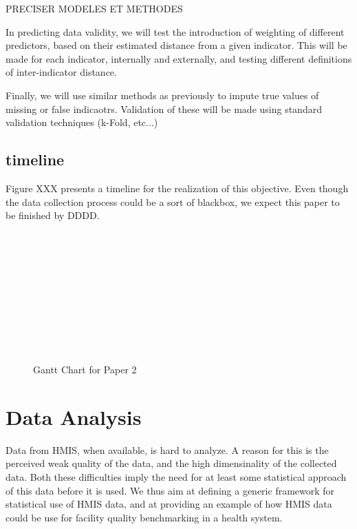 \documentclass[a4paper,11pt,final,twoside]{article}
\begin{document}
PRECISER MODELES ET METHODES

In predicting data validity, we will test the introduction of weighting of different predictors, based on their estimated distance from a given indicator. This will be made for each indicator, internally and externally, and testing different definitions of inter-indicator distance.

Finally, we will use similar methods as previously to impute true values of missing or false indicaotrs. Validation of these will be made using standard validation techniques (k-Fold, etc...)

\subsection{timeline}

Figure XXX presents a timeline for the realization of this objective. Even though the data collection process could be a sort of blackbox, we expect this paper to be finished by DDDD.

\begin{figure}[h]
\begin{ganttchart}{1}{24}
 \\
 \\
 \\
 \\
 \\
 \\
 \\
 \\
 \\
\end{ganttchart}
\caption{Gantt Chart for Paper 2}
\end{figure}

\section{Data Analysis}

Data from HMIS, when available, is hard to analyze. A reason for this is the perceived weak quality of the data, and the high dimensinality of the collected data. Both these difficulties imply the need for at least some statistical approach of this data before it is used. We thus aim at defining a generic framework for statistical use of HMIS data, and at providing an example of how HMIS data could be use for facility quality benchmarking in a health system.
\end{document}
